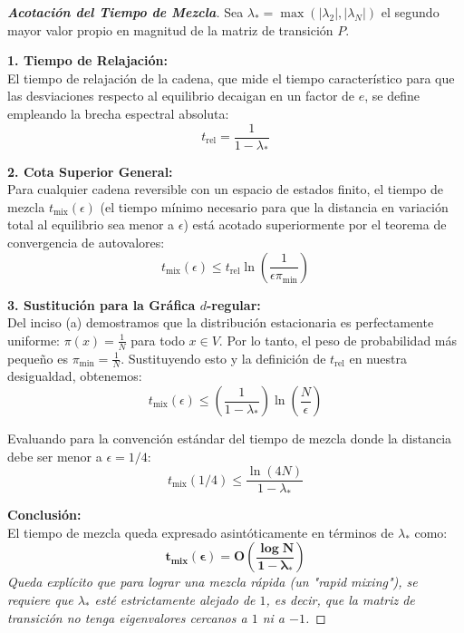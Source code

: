 \documentclass[10pt,a4paper]{article}
\begin{document}
\vspace{5mm}

\begin{proof}[\textbf{Acotación del Tiempo de Mezcla}]
    Sea $\lambda_* = \max(|\lambda_2|, |\lambda_N|)$ el segundo mayor valor propio en magnitud de la matriz de transición $P$.

    \textbf{1. Tiempo de Relajación:} \\
    El tiempo de relajación de la cadena, que mide el tiempo característico para que las desviaciones respecto al equilibrio decaigan en un factor de $e$, se define empleando la brecha espectral absoluta:
    \[ t_{\text{rel}} = \frac{1}{1 - \lambda_*} \]

    \textbf{2. Cota Superior General:} \\
    Para cualquier cadena reversible con un espacio de estados finito, el tiempo de mezcla $t_{\text{mix}}(\epsilon)$ (el tiempo mínimo necesario para que la distancia en variación total al equilibrio sea menor a $\epsilon$) está acotado superiormente por el teorema de convergencia de autovalores:
    \[ t_{\text{mix}}(\epsilon) \le t_{\text{rel}} \ln\left(\frac{1}{\epsilon \pi_{\min}}\right) \]

    \textbf{3. Sustitución para la Gráfica $d$-regular:} \\
    Del inciso (a) demostramos que la distribución estacionaria es perfectamente uniforme: $\pi(x) = \frac{1}{N}$ para todo $x \in V$.
    Por lo tanto, el peso de probabilidad más pequeño es $\pi_{\min} = \frac{1}{N}$. Sustituyendo esto y la definición de $t_{\text{rel}}$ en nuestra desigualdad, obtenemos:
    \[ t_{\text{mix}}(\epsilon) \le \left( \frac{1}{1 - \lambda_*} \right) \ln\left(\frac{N}{\epsilon}\right) \]

    Evaluando para la convención estándar del tiempo de mezcla donde la distancia debe ser menor a $\epsilon = 1/4$:
    \[ t_{\text{mix}}(1/4) \le \frac{\ln(4N)}{1 - \lambda_*} \]

    \textbf{Conclusión:} \\
    El tiempo de mezcla queda expresado asintóticamente en términos de $\lambda_*$ como:
    \[ \mathbf{t_{\text{mix}}(\epsilon) = O\left( \frac{\log N}{1 - \lambda_*} \right)} \]
    \textit{Queda explícito que para lograr una mezcla rápida (un "rapid mixing"), se requiere que $\lambda_*$ esté estrictamente alejado de $1$, es decir, que la matriz de transición no tenga eigenvalores cercanos a $1$ ni a $-1$.}
\end{proof}
\end{document}
